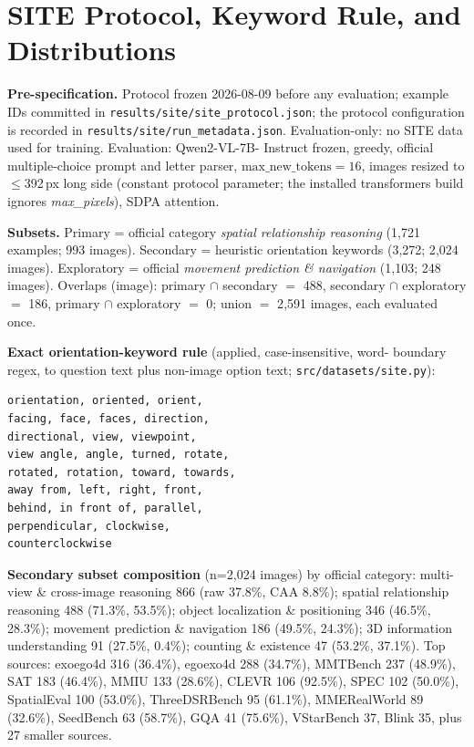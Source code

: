 \section{SITE Protocol, Keyword Rule, and Distributions}
\label{app:site}

\textbf{Pre-specification.} Protocol frozen 2026-08-09 before any evaluation;
example IDs committed in \texttt{results/site/site\_protocol.json}; the
protocol configuration is recorded in \texttt{results/site/run\_metadata.json}.
Evaluation-only: no SITE data used for training. Evaluation: Qwen2-VL-7B-
Instruct frozen, greedy, official multiple-choice prompt and letter parser,
$\mathrm{max\_new\_tokens}{=}16$, images resized to $\le$392\,px long side
(constant protocol parameter; the installed transformers build ignores
\emph{max\_pixels}), SDPA attention.

\textbf{Subsets.} Primary = official category \emph{spatial relationship
reasoning} (1{,}721 examples; 993 images). Secondary = heuristic orientation
keywords (3{,}272; 2{,}024 images). Exploratory = official \emph{movement
prediction \& navigation} (1{,}103; 248 images). Overlaps (image): primary
$\cap$ secondary $=$ 488, secondary $\cap$ exploratory $=$ 186, primary $\cap$
exploratory $=$ 0; union $=$ 2{,}591 images, each evaluated once.

\textbf{Exact orientation-keyword rule} (applied, case-insensitive, word-
boundary regex, to question text plus non-image option text;
\texttt{src/datasets/site.py}):
\begin{verbatim}
orientation, oriented, orient,
facing, face, faces, direction,
directional, view, viewpoint,
view angle, angle, turned, rotate,
rotated, rotation, toward, towards,
away from, left, right, front,
behind, in front of, parallel,
perpendicular, clockwise,
counterclockwise
\end{verbatim}

\textbf{Secondary subset composition} (n=2,024 images) by official category:
multi-view \& cross-image reasoning 866 (raw 37.8\%, CAA 8.8\%); spatial
relationship reasoning 488 (71.3\%, 53.5\%); object localization \& positioning
346 (46.5\%, 28.3\%); movement prediction \& navigation 186 (49.5\%, 24.3\%);
3D information understanding 91 (27.5\%, 0.4\%); counting \& existence 47
(53.2\%, 37.1\%). Top sources: exoego4d 316 (36.4\%), egoexo4d 288 (34.7\%),
MMTBench 237 (48.9\%), SAT 183 (46.4\%), MMIU 133 (28.6\%), CLEVR 106 (92.5\%),
SPEC 102 (50.0\%), SpatialEval 100 (53.0\%), ThreeDSRBench 95 (61.1\%),
MMERealWorld 89 (32.6\%), SeedBench 63 (58.7\%), GQA 41 (75.6\%), VStarBench 37,
Blink 35, plus 27 smaller sources.

